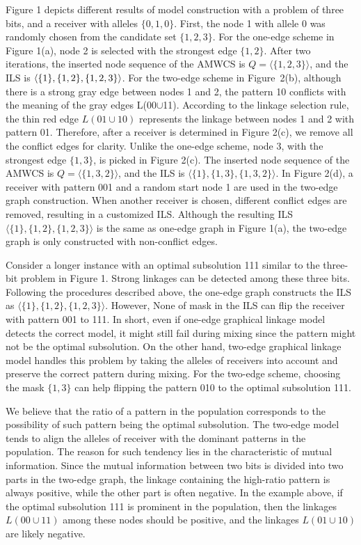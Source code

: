 \documentclass{sig-alternate-05-2015}
\begin{document}
Figure 1 depicts different results of model construction with  a problem of three bits, and a receiver with alleles $\{0, 1, 0\}$. First, the node 1 with allele 0 was randomly chosen from the candidate set $\{1, 2, 3\}$. For the one-edge scheme in Figure 1(a), node 2 is selected with the strongest edge $\{1, 2\}$. After two iterations, the inserted node sequence of the AMWCS  is $Q = \langle\{1, 2, 3\}\rangle$, and the ILS is  $\langle\{1\}, \{1, 2\}, \\ \{1, 2, 3\}\rangle$. For the two-edge scheme in Figure~2(b), although there is a strong gray edge between nodes 1 and 2,  the pattern 10 conflicts with the meaning of the gray edges L(00$\cup$11). According to the linkage selection rule, the thin red edge $L(01\cup10)$ represents the linkage between nodes 1 and 2 with pattern 01. Therefore, after a receiver is determined in Figure 2(c), we remove all the conflict edges for clarity. Unlike the one-edge scheme, node 3, with the strongest edge $\{1, 3\}$, is picked in Figure 2(c). The inserted node sequence of the AMWCS is $Q = \langle\{1, 3, 2\}\rangle$,  and the ILS is $\langle\{1\}, \{1, 3\}, \{1, 3, 2\}\rangle$. In Figure 2(d), a receiver with pattern 001 and a random start node 1 are used in the two-edge graph construction. When another receiver is chosen, different conflict edges are removed, resulting in a customized ILS. Although the resulting ILS  $\langle\{1\}, \{1, 2\}, \{1, 2, 3\}\rangle$ is the same as one-edge graph in Figure 1(a), the two-edge graph is only constructed with non-conflict edges. 

Consider a longer instance with an optimal subsolution 111 similar to the three-bit problem in Figure 1. Strong linkages can be detected among these three bits. Following the procedures described above, the one-edge graph constructs the ILS as $\langle\{1\}, \{1, 2\}, \{1, 2, 3\}\rangle$. However, None of mask in the ILS can flip the receiver with pattern 001 to 111. In short, even if one-edge graphical linkage model detects the correct model, it might still fail during mixing since the pattern might not be the optimal subsolution. On the other hand, two-edge graphical linkage model  handles this problem by taking the alleles of receivers into account and preserve the correct pattern during mixing. For the two-edge scheme, choosing the mask $\{1, 3\}$ can help flipping the pattern 010 to the optimal subsolution 111.   

We believe that the ratio of a pattern in the population corresponds to the possibility of such pattern being the optimal subsolution. The two-edge model tends to align the alleles of receiver  with the dominant patterns in the population. The reason for such tendency lies in the characteristic of mutual information. Since the mutual information between two bits is divided into two parts in the two-edge graph,  the  linkage containing the high-ratio pattern  is always positive, while the other part is often negative.  In the example above, if the optimal subsolution 111 is prominent in the population, then the linkages $L(00\cup11)$ among these nodes should be positive, and the linkages $L(01\cup10)$ are likely negative.  
\end{document}
